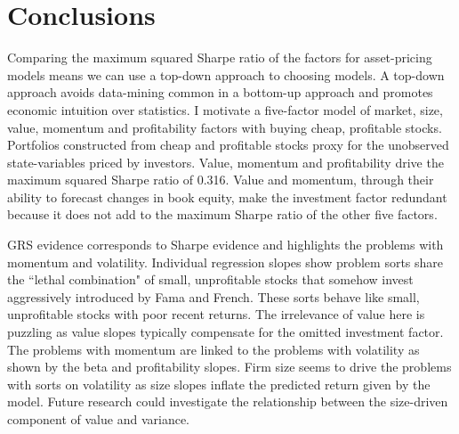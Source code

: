 
\section*{Conclusions}

Comparing the maximum squared Sharpe ratio of the factors for asset-pricing
models means we can use a top-down approach to choosing models.
A top-down approach avoids data-mining common in a bottom-up approach and
promotes economic intuition over statistics.
I motivate a five-factor model of market, size, value, momentum and
profitability factors with buying cheap, profitable stocks.
Portfolios constructed from cheap and profitable stocks proxy for the
unobserved state-variables priced by investors.
Value, momentum and profitability drive the maximum squared Sharpe ratio of
0.316.
Value and momentum, through their ability to forecast changes in book equity,
make the investment factor redundant because it does not add
to the maximum Sharpe ratio of the other five factors.

GRS evidence corresponds to Sharpe evidence and highlights the problems with
momentum and volatility.
Individual regression slopes show problem sorts share the ``lethal combination"
of small, unprofitable stocks that somehow invest aggressively introduced by
Fama and French.
These sorts behave like small, unprofitable stocks with poor recent returns.
The irrelevance of value here is puzzling as value slopes typically
compensate for the omitted investment factor.
The problems with momentum are linked to the problems with volatility as shown
by the beta and profitability slopes.
Firm size seems to drive the problems with sorts on volatility as size
slopes inflate the predicted return given by the model.
Future research could investigate the relationship between the size-driven
component of value and variance.
